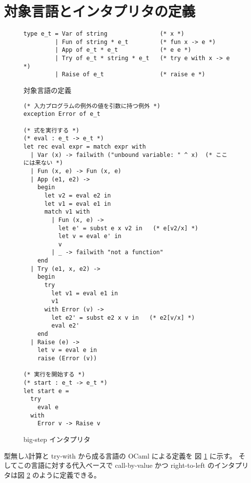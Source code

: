  \section{対象言語とインタプリタの定義}
\label{section:try-with__interpreter}

\begin{figure}
\begin{spacing}{0.8}
\begin{verbatim}
type e_t = Var of string               (* x *)
         | Fun of string * e_t         (* fun x -> e *)
         | App of e_t * e_t            (* e e *)
         | Try of e_t * string * e_t   (* try e with x -> e *)
         | Raise of e_t                (* raise e *)
\end{verbatim}
\end{spacing}
\caption{対象言語の定義}
\label{figure:typee}
\end{figure}

\begin{figure}
\begin{spacing}{0.8}
\begin{verbatim}
(* 入力プログラムの例外の値を引数に持つ例外 *)
exception Error of e_t

(* 式を実行する *)
(* eval : e_t -> e_t *)
let rec eval expr = match expr with
  | Var (x) -> failwith ("unbound variable: " ^ x)  (* ここには来ない *)
  | Fun (x, e) -> Fun (x, e)
  | App (e1, e2) ->
    begin
      let v2 = eval e2 in
      let v1 = eval e1 in
      match v1 with
        | Fun (x, e) ->
          let e' = subst e x v2 in   (* e[v2/x] *)
          let v = eval e' in
          v
        | _ -> failwith "not a function"
    end
  | Try (e1, x, e2) ->
    begin
      try
        let v1 = eval e1 in
        v1
      with Error (v) ->
        let e2' = subst e2 x v in   (* e2[v/x] *)
        eval e2'
    end
  | Raise (e) ->
    let v = eval e in
    raise (Error (v))

(* 実行を開始する *)
(* start : e_t -> e_t *)
let start e =
  try
    eval e
  with
    Error v -> Raise v
\end{verbatim}
\end{spacing}
\caption{big-step インタプリタ}
\label{figure:interpreter}
\end{figure}


型無し$\lambda$計算と try-with から成る言語の OCaml による定義を
図 \ref{figure:typee} に示す。
そしてこの言語に対する代入ベースで call-by-value かつ right-to-left
のインタプリタは図 \ref{figure:interpreter} のように定義できる。

